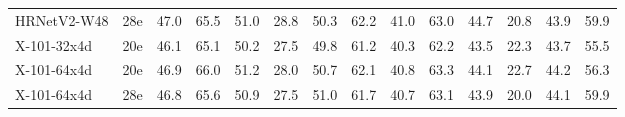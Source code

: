 \documentclass[10pt,journal,compsoc]{IEEEtran}
\begin{document}
\begin{center}
\begin{longtable}{l|c|cccccc|cccccc}
    {HRNetV2-W48} & {28e} & 47.0 & 65.5 & 51.0 & 28.8 & 50.3 & 62.2 & 41.0 & 63.0 & 44.7 & 20.8 & 43.9 & 59.9 \\
	X-101-32x4d & 20e & 46.1 & 65.1 & 50.2 & 27.5 & 49.8 & 61.2 & 40.3 & 62.2 & 43.5 & 22.3 & 43.7 & 55.5 \\
	X-101-64x4d & 20e & 46.9 & 66.0 & 51.2 & 28.0 & 50.7 & 62.1 & 40.8 & 63.3 & 44.1 & 22.7 & 44.2 & 56.3 \\
	{X-101-64x4d} & {28e}  & 46.8 & 65.6 & 50.9 & 27.5 & 51.0 & 61.7 & 40.7 & 63.1 & 43.9 & 20.0 & 44.1 & 59.9 \\
\end{longtable}
\end{center}
\end{document}
